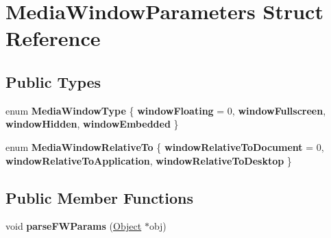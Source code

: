 \hypertarget{struct_media_window_parameters}{}\section{Media\+Window\+Parameters Struct Reference}
\label{struct_media_window_parameters}
\subsection*{Public Types}
\begin{DoxyCompactItemize}
\item 
\mbox{\label{struct_media_window_parameters_aa5cb2731efba5a653fb25a2dc56fe4ea}} 
enum {\bfseries Media\+Window\+Type} \{ {\bfseries window\+Floating} = 0, 
{\bfseries window\+Fullscreen}, 
{\bfseries window\+Hidden}, 
{\bfseries window\+Embedded}
 \}
\item 
\mbox{\label{struct_media_window_parameters_a8d3aa9aa04fba5373ff786d674a171e7}} 
enum {\bfseries Media\+Window\+Relative\+To} \{ {\bfseries window\+Relative\+To\+Document} = 0, 
{\bfseries window\+Relative\+To\+Application}, 
{\bfseries window\+Relative\+To\+Desktop}
 \}
\end{DoxyCompactItemize}
\subsection*{Public Member Functions}
\begin{DoxyCompactItemize}
\item 
\mbox{\label{struct_media_window_parameters_a65dc5686d4d444c19f1683fe99f25f04}} 
void {\bfseries parse\+F\+W\+Params} (\hyperlink{class_object}{Object} $\ast$obj)
\end{DoxyCompactItemize}
